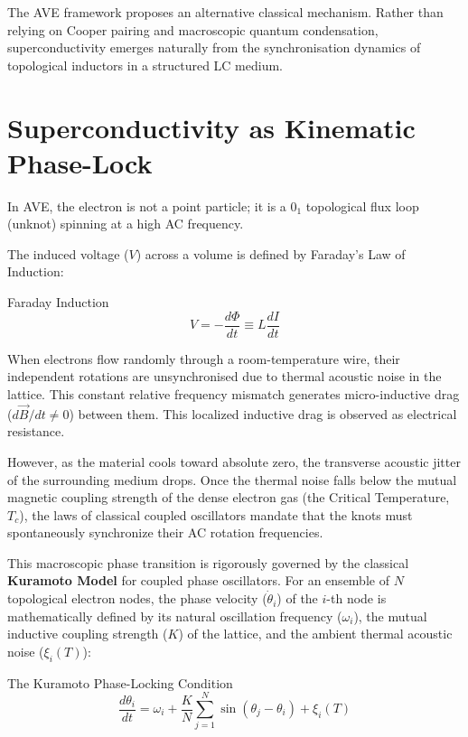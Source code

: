The AVE framework proposes an alternative classical mechanism. Rather than relying on Cooper pairing and macroscopic quantum condensation, superconductivity emerges naturally from the synchronisation dynamics of topological inductors in a structured LC medium.

\section{Superconductivity as Kinematic Phase-Lock}
In AVE, the electron is not a point particle; it is a $0_1$ topological flux loop (unknot) spinning at a high AC frequency. 

The induced voltage ($V$) across a volume is defined by Faraday's Law of Induction:
\begin{resultbox}{Faraday Induction}
\begin{equation}
    V = - \frac{d\Phi}{dt} \equiv L \frac{dI}{dt}
\end{equation}
\end{resultbox}

When electrons flow randomly through a room-temperature wire, their independent rotations are unsynchronised due to thermal acoustic noise in the lattice. This constant relative frequency mismatch generates micro-inductive drag ($d\vec{B}/dt \neq 0$) between them. This localized inductive drag is observed as electrical resistance.

However, as the material cools toward absolute zero, the transverse acoustic jitter of the surrounding medium drops. Once the thermal noise falls below the mutual magnetic coupling strength of the dense electron gas (the Critical Temperature, $T_c$), the laws of classical coupled oscillators mandate that the knots must spontaneously synchronize their AC rotation frequencies.

This macroscopic phase transition is rigorously governed by the classical \textbf{Kuramoto Model} for coupled phase oscillators. For an ensemble of $N$ topological electron nodes, the phase velocity ($\dot{\theta}_i$) of the $i$-th node is mathematically defined by its natural oscillation frequency ($\omega_i$), the mutual inductive coupling strength ($K$) of the lattice, and the ambient thermal acoustic noise ($\xi_i(T)$):
\begin{resultbox}{The Kuramoto Phase-Locking Condition}
\begin{equation}
    \frac{d\theta_i}{dt} = \omega_i + \frac{K}{N} \sum_{j=1}^N \sin(\theta_j - \theta_i) + \xi_i(T)
\end{equation}
\end{resultbox}

